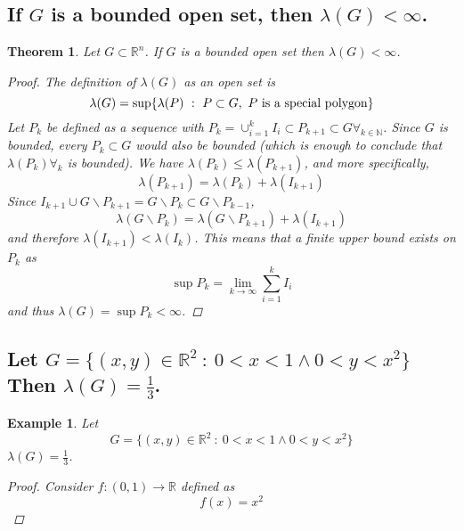 \documentclass[]{article}
\newcommand{\R}{\mathbb{R}}
\newcommand{\N}{\mathbb{N}}
\newcommand{\st}{\ : \ }
\newtheorem{theorem}{Theorem}
\newtheorem{example}{Example}
\begin{document}
\subsection{If $G$ is a bounded open set, then $\lambda(G) < \infty$.}
\begin{theorem}
    Let $G \subset \R^n$.
    If $G$ is a bounded open set then $\lambda(G) < \infty$.
    \begin{proof}
        The definition of $\lambda(G)$ as an open set is \[
            \lambda(G) = \sup \{
                \lambda(P) \st P \subset G, \ P \textnormal{ is a special polygon}
            \}
        \] Let $P_k$ be defined as a sequence with $P_k = \cup_{i=1}^{k} I_i \subset P_{k+1} \subset G \forall_{k \in \N}$.
        Since $G$ is bounded, every $P_{k} \subset G$ would also be bounded (which is enough to conclude that $\lambda(P_k) \forall_{k}$ is bounded).
        We have $\lambda(P_k) \leq \lambda(P_{k+1})$, and more specifically,\[
            \lambda(P_{k+1}) = \lambda(P_{k}) + \lambda(I_{k+1})
        \] Since $I_{k+1} \cup G \backslash P_{k+1} = G \backslash P_{k} \subset G \backslash P_{k-1}$, \[
            \lambda(G \backslash P_{k}) = \lambda(G \backslash P_{k+1}) + \lambda(I_{k+1})
        \] and therefore $\lambda(I_{k+1}) < \lambda(I_{k})$. 
        This means that a finite upper bound exists on $P_k$ as \[
            \sup{P_k} = \lim_{k\to \infty} \sum_{i=1}^k I_i
        \] and thus $\lambda(G) = \sup{P_k} < \infty$.
    \end{proof}
\end{theorem}

\subsection{
    Let $G = \{(x,y) \in \R^2 \st 0 < x < 1 \land 0 < y < x^2\}$
    Then $\lambda(G) = \frac{1}{3}$.
}
\begin{example}
    Let \[
        G = \{(x,y) \in \R^2 \st 0 < x < 1 \land 0 < y < x^2\}
    \]
    $\lambda(G) = \frac{1}{3}$.
    \begin{proof}
        Consider $f : (0,1) \to \R$ defined as \[
            f(x) = x^2
        \]
    \end{proof}
\end{example}
\end{document}
